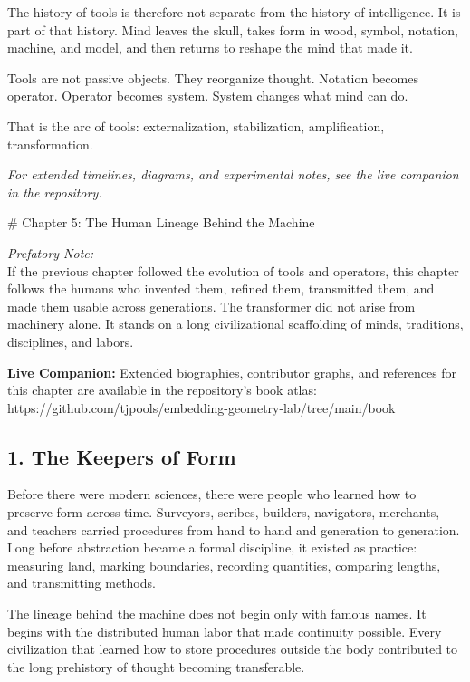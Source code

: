 \documentclass[
]{article}
\begin{document}
The history of tools is therefore not separate from the history of
intelligence. It is part of that history. Mind leaves the skull, takes
form in wood, symbol, notation, machine, and model, and then returns to
reshape the mind that made it.

Tools are not passive objects. They reorganize thought. Notation becomes
operator. Operator becomes system. System changes what mind can do.

That is the arc of tools: externalization, stabilization, amplification,
transformation.

\emph{For extended timelines, diagrams, and experimental notes, see the
live companion in the repository.}

\newpage
\vspace*{3cm}
\begin{center}
# Chapter 5: The Human Lineage Behind the Machine
\end{center}

\emph{Prefatory Note:}\\
If the previous chapter followed the evolution of tools and operators,
this chapter follows the humans who invented them, refined them,
transmitted them, and made them usable across generations. The
transformer did not arise from machinery alone. It stands on a long
civilizational scaffolding of minds, traditions, disciplines, and
labors.

\textbf{Live Companion:} Extended biographies, contributor graphs, and
references for this chapter are available in the repository's book
atlas:\\
https://github.com/tjpools/embedding-geometry-lab/tree/main/book

\hypertarget{the-keepers-of-form}{%
\subsection{1. The Keepers of Form}\label{the-keepers-of-form}}

Before there were modern sciences, there were people who learned how to
preserve form across time. Surveyors, scribes, builders, navigators,
merchants, and teachers carried procedures from hand to hand and
generation to generation. Long before abstraction became a formal
discipline, it existed as practice: measuring land, marking boundaries,
recording quantities, comparing lengths, and transmitting methods.

The lineage behind the machine does not begin only with famous names. It
begins with the distributed human labor that made continuity possible.
Every civilization that learned how to store procedures outside the body
contributed to the long prehistory of thought becoming transferable.
\end{document}
